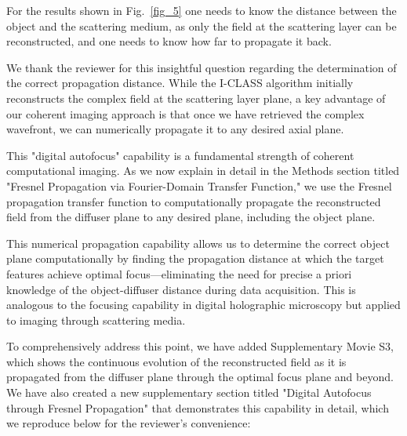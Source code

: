 \documentclass[12pt]{article}
\newenvironment{solved_reviewercomment}
    {\begin{tcolorbox}[width=\linewidth,colback=gray!5,colframe=solved_commentcolor!50,title=Reviewer Comment,left=5pt,right=5pt]}
    {\end{tcolorbox}}
\newenvironment{ourresponse}
    {\begin{tcolorbox}[width=\linewidth,breakable,enhanced,colback=gray!5,colframe=responsecolor!50,title=Response,left=5pt,right=5pt]}
    {\end{tcolorbox}}
\begin{document}
            

        
    \leavevmode\vspace{-\baselineskip}
        \begin{solved_reviewercomment}
            For the results shown in Fig.~\ref{fig_5} one needs to know the distance between the object and the scattering medium, as only the field at the scattering layer can be reconstructed, and one needs to know how far to propagate it back.
        \end{solved_reviewercomment}

        \begin{ourresponse}
            We thank the reviewer for this insightful question regarding the determination of the correct propagation distance. While the I-CLASS algorithm initially reconstructs the complex field at the scattering layer plane, a key advantage of our coherent imaging approach is that once we have retrieved the complex wavefront, we can numerically propagate it to any desired axial plane.
            
            This "digital autofocus" capability is a fundamental strength of coherent computational imaging. As we now explain in detail in the Methods section titled "Fresnel Propagation via Fourier-Domain Transfer Function," we use the Fresnel propagation transfer function to computationally propagate the reconstructed field from the diffuser plane to any desired plane, including the object plane.
            
            This numerical propagation capability allows us to determine the correct object plane computationally by finding the propagation distance at which the target features achieve optimal focus—eliminating the need for precise a priori knowledge of the object-diffuser distance during data acquisition. This is analogous to the focusing capability in digital holographic microscopy but applied to imaging through scattering media.
            
            To comprehensively address this point, we have added Supplementary Movie S3, which shows the continuous evolution of the reconstructed field as it is propagated from the diffuser plane through the optimal focus plane and beyond. We have also created a new supplementary section titled "Digital Autofocus through Fresnel Propagation" that demonstrates this capability in detail, which we reproduce below for the reviewer's convenience:
        
            \begin{quote}

\end{quote}
\end{ourresponse}
\end{document}
